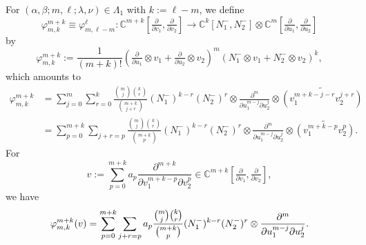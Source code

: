 \documentclass[reqno,11pt]{amsart}
\theoremstyle{remark}
\numberwithin{equation}{section}
\newcommand{\gb}{\beta}
\newcommand{\ga}{\alpha}
\newcommand{\gL}{\Lambda}
\newcommand{\C}{\mathbb{C}}
\newcommand{\To}{\longrightarrow}
\begin{document}
\vskip 0.1in

For $(\ga, \gb; m,\ell; \lambda,\nu) \in \gL_1$ with $k:=\ell-m$,
we define 
\begin{equation*}
\varphi_{m,k}^{m+k} \equiv \varphi_{m,\ell-m}^{\ell} \colon 
\C^{m+k}\left[\tfrac{\partial}{\partial v_1}, \tfrac{\partial}{\partial v_2}\right]
\To
\C^k[N_1^-, N_2^-]
\otimes \C^m\left[\tfrac{\partial}{\partial u_1}, \tfrac{\partial}{\partial u_2}\right]
\end{equation*}
by
\begin{equation}\label{eqn:gP1}
\varphi_{m,k}^{m+k} :=
\frac{1}{(m+k)!}
\left(\tfrac{\partial}{\partial u_1}\otimes v_1 + \tfrac{\partial}{\partial u_2}\otimes v_2\right)^m
\left(N_1^-\otimes v_1 + N_2^-\otimes v_2\right)^k,
\end{equation}
which amounts to
\begin{align*}
\varphi_{m,k}^{m+k}
&=
\sum_{j=0}^m\sum_{r=0}^k
\frac{\binom{m}{j}\binom{k}{r}}{\binom{m+k}{j+r}}
(N_1^-)^{k-r}(N_2^-)^r
\otimes \frac{\partial^m}{\partial u_1^{m-j}\partial u_2^j}
\otimes \widetilde{\left(v_1^{m+k-j-r}v_2^{j+r}\right)}\\[3pt]
&=\sum_{p=0}^{m+k}\sum_{j+r=p}
\frac{\binom{m}{j}\binom{k}{r}}{\binom{m+k}{p}}
(N_1^-)^{k-r}(N_2^-)^r
\otimes \frac{\partial^m}{\partial u_1^{m-j}\partial u_2^j}
\otimes \widetilde{\left(v_1^{m+k-p}v_2^{p}\right)}.
\end{align*}
For 
\begin{equation*}
v:= \sum_{p=0}^{m+k} a_{p} 
\frac{\partial^{m+k}}{\partial v_1^{m+k-p} \partial v_2^{p}}
\in
\C^{m+k}\left[\tfrac{\partial}{\partial v_1}, \tfrac{\partial}{\partial v_2}\right],
\end{equation*}
we have 
\begin{equation*}
\varphi_{m,k}^{m+k}(v) = 
\sum_{p=0}^{m+k}\sum_{j+r=p}
a_p
\frac{\binom{m}{j}\binom{k}{r}}{\binom{m+k}{p}}
(N_1^-)^{k-r}(N_2^-)^r
\otimes \frac{\partial^m}{\partial u_1^{m-j}\partial u_2^j}.\\[3pt]
\end{equation*}
\end{document}
